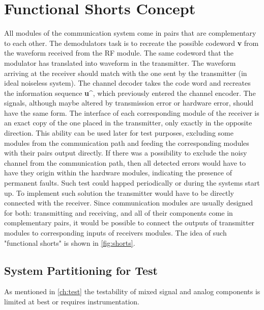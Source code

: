 \section{Functional Shorts Concept}

All modules of the communication system come in pairs that are complementary to each other. The demodulators task is to recreate the possible codeword \textbf{v} from the waveform received from the RF module. The same codeword that the modulator has translated into waveform in the transmitter. The waveform arriving at the receiver should match with the one sent by the transmitter (in ideal noiseless system). The channel decoder takes the code word and recreates the information sequence \textbf{u\^}, which previously entered the channel encoder. The signals, although maybe altered by transmission error or hardware error, should have the same form. The interface of each corresponding module of the receiver is an exact copy of the one placed in the transmitter, only exactly in the opposite direction. This ability can be used later for test purposes, excluding some modules from the communication path and feeding the corresponding modules with their pairs output directly.
If there was a possibility to exclude the noisy channel from the communication path, then all detected errors would have to have they origin within the hardware modules, indicating the presence of permanent faults. Such test could happed periodically or during the systems start up.
To implement such solution the transmitter would have to be directly connected with the receiver. Since communication modules are usually designed for both: transmitting and receiving, and all of their components come in complementary pairs, it would be possible to connect the outputs of transmitter modules to corresponding inputs of receivers modules. The idea of such "functional shorts" is shown in \autoref{fig:shorts}.
\subsection{System Partitioning for Test}
 As mentioned in \autoref{ch:test} the testability of mixed signal and analog components is limited at best or requires instrumentation. 
